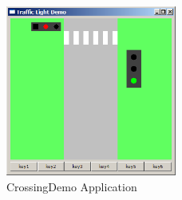 \begin{figure}[h!]
\center
\includegraphics[width=0.5\textwidth]{./Pictures/Screenshot21}
\caption{\label{fig:screenshot21} CrossingDemo Application}
\end{figure}